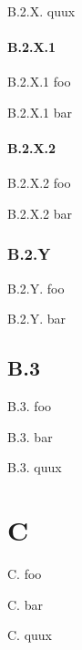 \documentclass[11pt]{article}
\begin{document}
    B.2.X. quux

    \paragraph{B.2.X.1}

    B.2.X.1 foo

    B.2.X.1 bar

    \paragraph{B.2.X.2}

    B.2.X.2 foo

    B.2.X.2 bar

    \subsubsection{B.2.Y}

    B.2.Y. foo

    B.2.Y. bar

    \subsection{B.3}

    B.3. foo

    B.3. bar

    B.3. quux

    \section{C}

    C. foo

    C. bar

    C. quux
\end{document}
